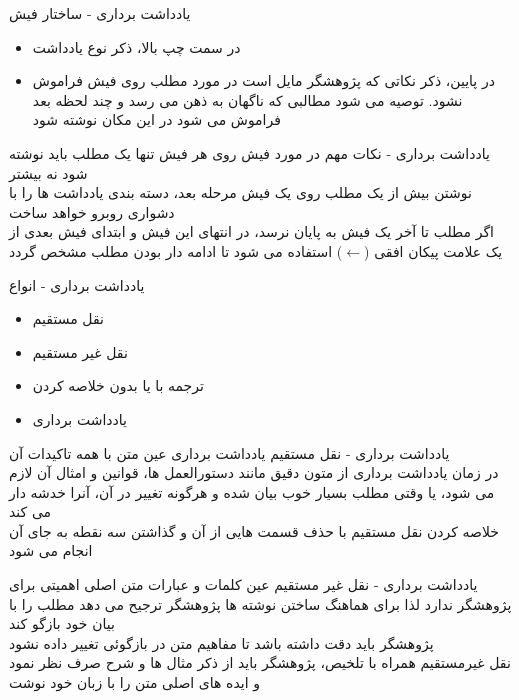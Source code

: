 \documentclass[14pt]{beamer}
\makeatletter
\newcommand{\rtlist}{\raggedleft\rightskip\@totalleftmargin}
\newcommand{\framefontsizelarge}{\fontsize{18pt}{0pt}\selectfont}
\newcommand{\frametitlefontsize}{\fontsize{20pt}{0pt}\selectfont}
\newcommand{\defaultvspace}{\vspace{5mm}}
\makeatother
\begin{document}
\begin{persian}
\begin{frame}{\frametitlefontsize یادداشت برداری - ساختار فیش}
		\begin{itemize}\rtlist
			\item در سمت چپ بالا، ذکر نوع یادداشت  
			\defaultvspace\\
			\item در پایین، ذکر نکاتی که پژوهشگر مایل است در مورد مطلب روی فیش فراموش نشود. توصیه می شود مطالبی که ناگهان به ذهن می رسد و چند لحظه بعد فراموش می شود در این مکان نوشته شود
		\end{itemize}
	\end{frame}	
	
	\begin{frame}{\frametitlefontsize یادداشت برداری - نکات مهم در مورد فیش}
		\framefontsizelarge
		روی هر فیش تنها یک مطلب باید نوشته شود نه بیشتر\\
	   نوشتن بیش از یک مطلب روی یک فیش مرحله بعد، دسته بندی یادداشت ها را با دشواری روبرو خواهد ساخت\defaultvspace\\
	   
	   اگر مطلب تا آخر یک فیش به پایان نرسد، در انتهای این فیش و ابتدای فیش بعدی از یک علامت پیکان افقی 
	   ($\leftarrow$)
	   استفاده می شود تا ادامه دار بودن مطلب مشخص گردد	
	\end{frame}
	
	\begin{frame}{\frametitlefontsize یادداشت برداری - انواع}
		\framefontsizelarge
		\begin{itemize}\rtlist
			\item نقل مستقیم
			\item نقل غیر مستقیم
			\item ترجمه با یا بدون خلاصه کردن
			\item یادداشت برداری
		\end{itemize}
	\end{frame}
	
	\begin{frame}{\frametitlefontsize یادداشت برداری - نقل مستقیم}
		\framefontsizelarge
		یادداشت برداری عین متن با همه تاکیدات آن\defaultvspace\\
		در زمان یادداشت برداری از متون دقیق مانند دستورالعمل ها، قوانین و امثال آن لازم می شود، یا وقتی مطلب بسیار خوب بیان شده و هرگونه تغییر در آن، آنرا خدشه دار می کند\defaultvspace\\
		خلاصه کردن نقل مستقیم با حذف قسمت هایی از آن و گذاشتن سه نقطه به جای آن انجام می شود
	\end{frame}
	
	\begin{frame}{\frametitlefontsize یادداشت برداری - نقل غیر مستقیم}
		\framefontsizelarge
	   عین کلمات و عبارات متن اصلی اهمیتی برای پژوهشگر ندارد لذا برای هماهنگ ساختن نوشته ها پژوهشگر ترجیح می دهد مطلب را با بیان خود بازگو کند\defaultvspace\\
		پژوهشگر باید دقت داشته باشد تا مفاهیم متن در بازگوئی تغییر داده نشود\defaultvspace\\
		نقل غیرمستقیم همراه با تلخیص، پژوهشگر باید از ذکر مثال ها و شرح صرف نظر نمود و ایده های اصلی متن را با زبان خود نوشت
	\end{frame}
	

\end{persian}
\end{document}
